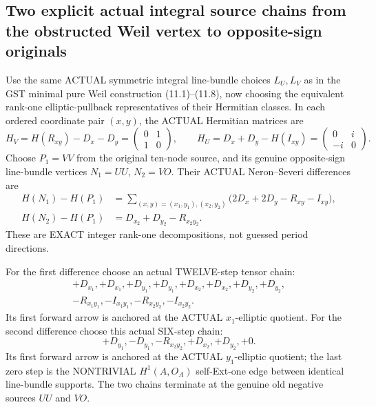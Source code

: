 \documentclass[11pt,a4paper]{article}
\begin{document}
\subsection*{Two explicit actual integral source chains from the obstructed Weil vertex to opposite-sign originals}
Use the
same ACTUAL
symmetric
integral
line-bundle
choices
\(L_U,L_V\)
as in the
GST minimal
pure Weil
construction
(11.1)--(11.8),
now choosing
the equivalent
rank-one
elliptic-pullback
representatives
of their
Hermitian
classes.
In each
ordered
coordinate
pair \((x,y)\),
the ACTUAL
Hermitian
matrices are
\[
 \boxed{
 H_V=H(R_{xy})-D_x-D_y
       =\begin{pmatrix}0&1\\1&0\end{pmatrix},
 \qquad
 H_U=D_x+D_y-H(I_{xy})
       =\begin{pmatrix}0&i\\-i&0\end{pmatrix}.
 }                                                       \tag{17.6}
\]
Choose
\(P_1=VV\)
from the
original
ten-node
source,
and its
genuine
opposite-sign
line-bundle
vertices
\(N_1=UU\),
\(N_2=VO\).
Their
ACTUAL
Neron--Severi
differences
are
\[
 \begin{aligned}
 H(N_1)-H(P_1)
 &=\sum_{(x,y)=(x_1,y_1),(x_2,y_2)}
     \bigl(2D_x+2D_y-R_{xy}-I_{xy}\bigr),\\
 H(N_2)-H(P_1)
 &=D_{x_2}+D_{y_2}-R_{x_2y_2}.
 \end{aligned}                                           \tag{17.7}
\]
These are
EXACT
integer
rank-one
decompositions,
not guessed
period
directions.

For the first
difference
choose an
actual
TWELVE-step
tensor chain:
\[
 \boxed{
 \begin{array}{l}
 +D_{x_1},
 +D_{x_1},
 +D_{y_1},
 +D_{y_1},
 +D_{x_2},
 +D_{x_2},
 +D_{y_2},
 +D_{y_2},\\
 -R_{x_1y_1},
 -I_{x_1y_1},
 -R_{x_2y_2},
 -I_{x_2y_2}.
 \end{array}}                                           \tag{17.8}
\]
Its first
forward arrow
is anchored
at the ACTUAL
\(x_1\)-elliptic
quotient.
For the
second difference
choose this
actual SIX-step
chain:
\[
 \boxed{
 +D_{y_1},
 -D_{y_1},
 -R_{x_2y_2},
 +D_{x_2},
 +D_{y_2},
 +0.
 }                                                       \tag{17.9}
\]
Its first
forward arrow
is anchored
at the ACTUAL
\(y_1\)-elliptic
quotient;
the last zero
step is the
NONTRIVIAL
\(H^1(A,O_A)\)
self-Ext-one
edge between
identical
line-bundle
supports.
The two
chains terminate
at the genuine
old negative
sources \(UU\)
and \(VO\).
\end{document}
